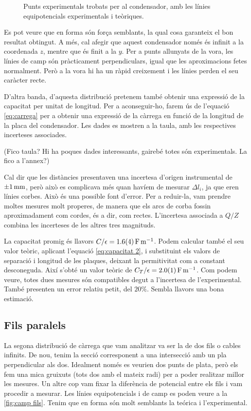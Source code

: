\begin{figure}[htb]
  \centering \small \sffamily
  
  \caption{Punts experimentals trobats per al condensador, amb les línies equipotencials experimentals i teòriques.}
  \label{fig:camp condensador}
\end{figure}

Es pot veure que en forma són força semblants, la qual cosa garanteix el bon resultat obtingut. A més, cal afegir que aquest condensador només és infinit a la coordenada $z$, mentre que és finit a la $y$. Per a punts allunyats de la vora, les línies de camp són pràcticament perpendiculars, igual que les aproximacions fetes normalment. Però a la vora hi ha un ràpid creixement i les línies perden el seu caràcter recte.

D'altra banda, d'aquesta distribució pretenem també obtenir una expressió de la capacitat per unitat de longitud. Per a aconseguir-ho, farem ús de l'equació \cref{eq:carrega} per a obtenir una expressió de la càrrega en funció de la longitud de la placa del condensador. Les dades es mostren a la taula, amb les respectives incerteses associades. 

(Fico taula? Hi ha poques dades interessants, gairebé totes són experimentals. La fico a l'annex?)

Cal dir que les distàncies presentaven una incertesa d'origen instrumental de $ \data{}{1}{mm} $, però això es complicava més quan havíem de mesurar $\Delta l_i$, ja que eren línies corbes. Això és una possible font d'error. Per a reduir-la, vam prendre moltes mesures molt properes, de manera que els arcs de corba fossin aproximadament com cordes, és a dir, com rectes. L'incertesa associada a $Q/Z$ combina les incerteses de les altres tres magnituds.

La capacitat promig és llavors $C/\epsilon = \data{1.6}{0.4}{F.m^{-1}}$. Podem calcular també el seu valor teòric, aplicant l'equació \cref{eq:capacitat 2}, i substituint els valors de separació i longitud de les plaques, deixant la permitivitat com a constant desconeguda.
Així s'obté un valor teòric de $C_T/\epsilon = \data{2.0}{0.1}{F.m^{-1}} $. Com podem veure, totes dues mesures són compatibles degut a l'incertesa de l'experimental. També presenten un error relatiu petit, del $20\%$. Sembla llavors una bona estimació.

\subsection{Fils paralels}
La segona distribució de càrrega que vam analitzar va ser la de dos fils o cables infinits. De nou, tenim la secció corresponent a una intersecció amb un pla perpendicular als dos. Idealment només es veurien dos punts de plata, però els fem una mica gruixuts (tots dos amb el mateix radi) per a poder realitzar millor les mesures. Un altre cop vam fixar la diferència de potencial entre els fils i vam procedir a mesurar. Les línies equipotencials i de camp es poden veure a la \cref{fig:camp fils}. Tenim que en forma són molt semblants la teórica i l'experimental.

